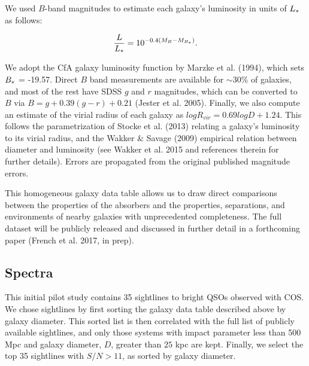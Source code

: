 \documentclass[iop]{emulateapj-rtx4}
\begin{document}
We used $B$-band magnitudes to estimate each galaxy's luminosity in units of $L_{\**}$ as follows:

\begin{equation}
	\frac{L}{L_{\**}} = 10^{-0.4 (M_{B} - M_{B_{\**}})}.
\end{equation}

We adopt the CfA galaxy luminosity function by Marzke et al. (1994), which sets $B_{\**} $ = -19.57. Direct $B$ band measurements are available for $\sim 30\%$ of galaxies, and most of the rest have SDSS $g$ and $r$ magnitudes, which can be converted to $B$ via $B = g + 0.39 (g-r) + 0.21$ (Jester et al. 2005). Finally, we also compute an estimate of the virial radius of each galaxy as $log R_{vir} = 0.69 log D + 1.24$. This follows the parametrization of Stocke et al. (2013) relating a galaxy's luminosity to its virial radius, and the Wakker $\&$ Savage (2009) empirical relation between diameter and luminosity (see Wakker et al. 2015 and references therein for further details). Errors are propagated from the original published magnitude errors.

This homogeneous galaxy data table allows us to draw direct comparisons between the properties of the absorbers and the properties, separations, and environments of nearby galaxies with unprecedented completeness. The full dataset will be publicly released and discussed in further detail in a forthcoming paper (French et al. 2017, in prep).


\subsection{Spectra}

This initial pilot study contains 35 sightlines to bright QSOs observed with COS. We chose sightlines by first sorting the galaxy data table described above by galaxy diameter. This sorted list is then correlated with the full list of publicly available sightlines, and only those systems with impact parameter less than 500 Mpc and galaxy diameter, $D$, greater than $25$ kpc  are kept. Finally, we select the top 35 sightlines with $S/N > 11$, as sorted by galaxy diameter.

\end{document}
